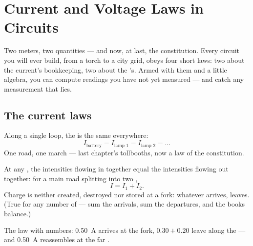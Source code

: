 \chapter{Current and Voltage Laws in Circuits}\label{ch:g8:circuit-laws}

Two meters, two quantities --- and now, at last, the
constitution. Every circuit you will ever build, from a torch to
a city grid, obeys four short laws: two about the current's
bookkeeping, two about the 's. Armed with them and a
little algebra, you can compute readings you have not yet
measured --- and catch any measurement that lies.

\section{The current laws}

\begin{proposition}\label{prop:g8:circuit-laws:seriesI}
Along a single loop, the  is the same everywhere:
\[
I_{\text{battery}} = I_{\text{lamp 1}} = I_{\text{lamp 2}} =
\dots
\]
One road, one march --- last chapter's tollbooths, now a law of
the constitution.
\end{proposition}

\begin{proposition}\label{prop:g8:circuit-laws:junction}
At any , the intensities flowing in together equal the
intensities flowing out together: for a main road splitting
into two ,
\[
I = I_1 + I_2 .
\]
Charge is neither created, destroyed nor stored at a fork:
whatever arrives, leaves. (True for any number of  ---
sum the arrivals, sum the departures, and the books balance.)
\end{proposition}

\begin{omfigure}

{\small The  law with numbers: \qty{0.50}{A} arrives at
the fork, $0.30 + 0.20$ leave along the  --- and
\qty{0.50}{A} reassembles at the far .}
\end{omfigure}


